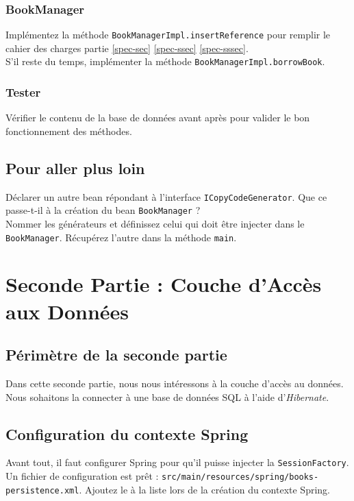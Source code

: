\documentclass[small,algo]{dushClass}
\begin{document}
\subsubsection{BookManager}
Implémentez la méthode \texttt{BookManagerImpl.insertReference} pour remplir le cahier des charges partie \ref{spec-sec} \ref{spec-ssec} \ref{spec-sssec}.\\

S'il reste du temps, implémenter la méthode \texttt{BookManagerImpl.borrowBook}.

\subsubsection{Tester}

Vérifier le contenu de la base de données avant après pour valider le bon fonctionnement des méthodes.

\subsection{Pour aller plus loin}

Déclarer un autre bean répondant à l'interface \texttt{ICopyCodeGenerator}. Que ce passe-t-il à la création du bean \texttt{BookManager} ?\\

Nommer les générateurs et définissez celui qui doit être injecter dans le \texttt{BookManager}. Récupérez l'autre dans la méthode \texttt{main}.



\section{Seconde Partie : Couche d'Accès aux Données}

\subsection{Périmètre de la seconde partie}
Dans cette seconde partie, nous nous intéressons à la couche d'accès au données. Nous sohaitons la connecter à une base de données SQL à l'aide d'\emph{Hibernate}.


\subsection{Configuration du contexte Spring}

Avant tout, il faut configurer Spring pour qu'il puisse injecter la \texttt{SessionFactory}. Un fichier de configuration est prêt : \texttt{src/main/resources/spring/books-persistence.xml}. Ajoutez le à la liste lors de la création du contexte Spring.\\
\end{document}
